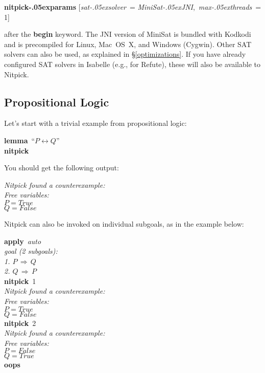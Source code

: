 \documentclass[a4paper,12pt]{article}
\renewcommand\_{\hbox{\textunderscore\kern-.05ex}}
\begin{document}
\prew
\textbf{nitpick\_params} [\textit{sat\_solver}~= \textit{MiniSat\_JNI}, \,\textit{max\_threads}~= 1]
\postw

after the \textbf{begin} keyword. The JNI version of MiniSat is bundled with
Kodkodi and is precompiled for Linux, Mac~OS~X, and Windows (Cygwin). Other SAT
solvers can also be used, as explained in \S\ref{optimizations}. If you
have already configured SAT solvers in Isabelle (e.g., for Refute), these will
also be available to Nitpick.

\subsection{Propositional Logic}
\label{propositional-logic}

Let's start with a trivial example from propositional logic:

\prew
\textbf{lemma}~``$P \longleftrightarrow Q$'' \\
\textbf{nitpick}
\postw

You should get the following output:

\prew
\slshape
Nitpick found a counterexample: \\[2\smallskipamount]
\hbox{}\qquad Free variables: \nopagebreak \\
\hbox{}\qquad\qquad $P = \textit{True}$ \\
\hbox{}\qquad\qquad $Q = \textit{False}$
\postw

Nitpick can also be invoked on individual subgoals, as in the example below:

\prew
\textbf{apply}~\textit{auto} \\[2\smallskipamount]
{\slshape goal (2 subgoals): \\
\phantom{0}1. $P\,\Longrightarrow\, Q$ \\
\phantom{0}2. $Q\,\Longrightarrow\, P$} \\[2\smallskipamount]
\textbf{nitpick}~1 \\[2\smallskipamount]
{\slshape Nitpick found a counterexample: \\[2\smallskipamount]
\hbox{}\qquad Free variables: \nopagebreak \\
\hbox{}\qquad\qquad $P = \textit{True}$ \\
\hbox{}\qquad\qquad $Q = \textit{False}$} \\[2\smallskipamount]
\textbf{nitpick}~2 \\[2\smallskipamount]
{\slshape Nitpick found a counterexample: \\[2\smallskipamount]
\hbox{}\qquad Free variables: \nopagebreak \\
\hbox{}\qquad\qquad $P = \textit{False}$ \\
\hbox{}\qquad\qquad $Q = \textit{True}$} \\[2\smallskipamount]
\textbf{oops}
\postw
\end{document}
